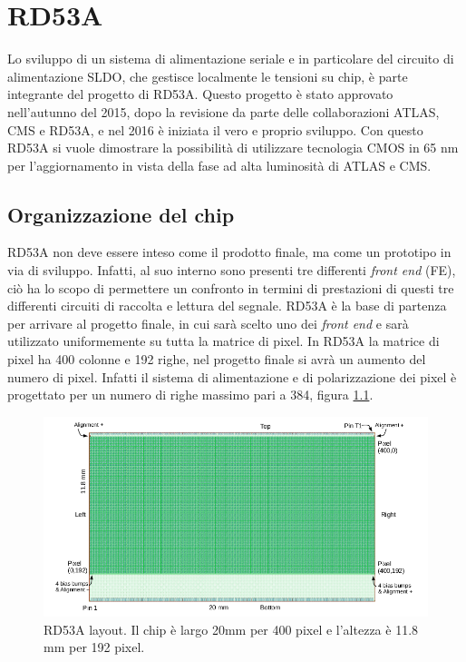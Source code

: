 \chapter{RD53A}

Lo sviluppo di un sistema di alimentazione seriale e in particolare del circuito di alimentazione SLDO, che gestisce localmente le tensioni su chip, è parte integrante del progetto di RD53A\cite{RD53A}.
Questo progetto è stato approvato nell'autunno del 2015, dopo la revisione da parte delle collaborazioni ATLAS, CMS e RD53A, e nel 2016 è iniziata il vero e proprio sviluppo. 
Con questo RD53A si vuole dimostrare la possibilità di utilizzare tecnologia CMOS  in 65 nm per l'aggiornamento in vista della fase ad alta luminosità di ATLAS e CMS. 

\section{Organizzazione del chip} 
RD53A non deve essere inteso come il prodotto finale, ma come un prototipo in via di sviluppo. Infatti, al suo interno sono presenti tre differenti \textit{front end} (FE), ciò ha lo scopo di permettere un confronto in termini di prestazioni di questi tre differenti circuiti di raccolta e lettura del segnale. 
RD53A è la base di partenza per arrivare al progetto finale, in cui sarà scelto uno dei \textit{front end} e sarà utilizzato uniformemente su tutta la matrice di pixel. In RD53A la matrice di pixel ha 400 colonne e 192 righe, nel progetto finale si avrà un aumento del numero di pixel. 
Infatti il sistema di alimentazione e di polarizzazione dei pixel è progettato per un numero di righe massimo pari a 384, figura \ref{RD53ALayout}.%
\begin{figure}
\centering
\includegraphics[scale=.4]{Immagini/RD53ALayout}
\caption{RD53A layout. Il chip è largo 20mm per 400 pixel e l'altezza è 11.8 mm per 192 pixel.}
\label{RD53ALayout}
\end{figure}

